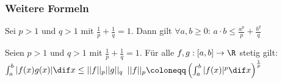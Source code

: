 \subsubsection{Weitere Formeln}
\begin{lemma}{}
	Sei $p > 1$ und $q > 1$ mit $\frac{1}{p} + \frac{1}{q} =1$.
	Dann gilt $\forall a,b \geq 0$: $a \cdot b \leq \frac{a^p}{p} + \frac{b^q}{q}$ 
\end{lemma}
\begin{theorem}{}
	Seien $p > 1$ und $q> 1$ mit $\frac{1}{p} + \frac{1}{q} = 1$.
	Für alle $f,g : [a,b] \to \R$ stetig gilt: $\int_{a}^{b} |f(x) g(x)| \dif x \leq ||f||_p ||g||_q$
	\tcblower
	$||f||_p \coloneqq \left( \int_{a}^{b} |f(x)|^p \dif x \right)^{\frac{1}{p}}$
\end{theorem}